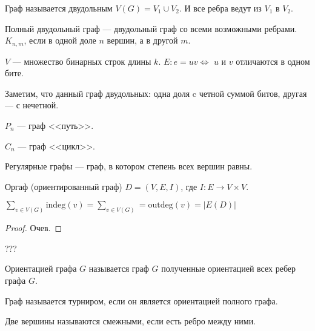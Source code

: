 \begin{definition}
    Граф называется двудольным $V(G) = V_1 \cup V_2$. И все ребра ведут из $V_1$ в  $V_2$.
\end{definition}
\begin{definition}
    Полный двудольный граф --- двудольный граф со всеми возможными ребрами. $K_{n, m}$, если в одной доле $n$ вершин, а в другой  $m$.
\end{definition}

\begin{definition}
    $V$ --- множество бинарных строк длины  $k$.  $E: e = uv \iff$ $u$ и  $v$ отличаются в одном бите. 
\end{definition}
\begin{remark}
    Заметим, что данный граф двудольных: одна доля c четной суммой битов, другая --- с нечетной.
\end{remark}
\begin{definition}
    $P_n$ --- граф <<путь>>.
\end{definition}
\begin{definition}
    $C_n$ --- граф <<цикл>>.
\end{definition}
\begin{definition}
    Регулярные графы --- граф, в котором степень всех вершин равны.
\end{definition}
\begin{definition}
    Оргаф (ориентированный граф) $D = (V, E, I)$, где $I: E \to V \times V$.
\end{definition}
\begin{theorem}
    $\displaystyle \sum_{v \in V(G)} \text{indeg}(v) = \sum_{v \in V(G)} = \text{outdeg}(v) = |E(D)|$
\end{theorem}
\begin{proof}
    Очев.
\end{proof}
\begin{definition}
    ???
\end{definition}
\begin{definition}
    Ориентацией графа $G$  называется граф $G$ полученные ориентацией всех ребер графа  $G$.
\end{definition}
\begin{definition}
    Граф называется турниром, если он является ориентацией полного графа.
\end{definition}
\begin{definition}
    Две вершины называются смежными, если есть ребро между ними.
\end{definition}

